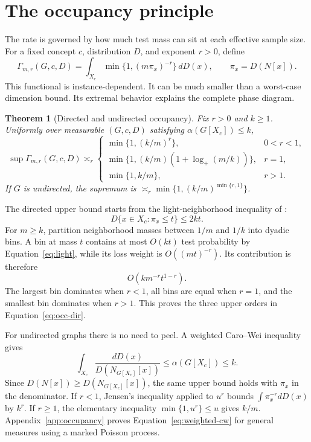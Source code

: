 \documentclass{article}
\newtheorem{theorem}{Theorem}
\theoremstyle{definition}
\theoremstyle{remark}
\newcommand{\gprof}{\Gamma}
\begin{document}
\section{The occupancy principle}
\label{sec:occupancy}

The rate is governed by how much test mass can sit at each effective sample size. For a fixed concept $c$, distribution $D$, and exponent $r>0$, define
\begin{equation}
\gprof_{m,r}(G,c,D)=\int_{X_c}\min\{1,(m\pi_x)^{-r}\}\,dD(x),
\qquad \pi_x=D(N[x]). \label{eq:profile}
\end{equation}
This functional is instance-dependent. It can be much smaller than a worst-case dimension bound. Its extremal behavior explains the complete phase diagram.

\begin{theorem}[Directed and undirected occupancy]
\label{thm:occupancy}
Fix $r>0$ and $k\geq1$. Uniformly over measurable $(G,c,D)$ satisfying $\alpha(G[X_c])\leq k$,
\begin{equation}
\sup \gprof_{m,r}(G,c,D)\asymp_r
\begin{cases}
\min\{1,(k/m)^r\},&0<r<1,\\
\min\{1,(k/m)(1+\log_+(m/k))\},&r=1,\\
\min\{1,k/m\},&r>1.
\end{cases} \label{eq:occ-dir}
\end{equation}
If $G$ is undirected, the supremum is $\asymp_r\min\{1,(k/m)^{\min\{r,1\}}\}$.
\end{theorem}

The directed upper bound starts from the light-neighborhood inequality of \citet{bressan2026conditional}:
\begin{equation}
D\{x\in X_c:\pi_x\leq t\}\leq2kt. \label{eq:light}
\end{equation}
For $m\geq k$, partition neighborhood masses between $1/m$ and $1/k$ into dyadic bins. A bin at mass $t$ contains at most $O(kt)$ test probability by Equation~\eqref{eq:light}, while its loss weight is $O((mt)^{-r})$. Its contribution is therefore
\begin{equation}
O\left(km^{-r}t^{1-r}\right). \label{eq:bin}
\end{equation}
The largest bin dominates when $r<1$, all bins are equal when $r=1$, and the smallest bin dominates when $r>1$. This proves the three upper orders in Equation~\eqref{eq:occ-dir}.

For undirected graphs there is no need to peel. A weighted Caro--Wei inequality \citep{caro1979new,wei1981lower} gives
\begin{equation}
\int_{X_c}\frac{dD(x)}{D(N_{G[X_c]}[x])}\leq\alpha(G[X_c])\leq k. \label{eq:weighted-cw}
\end{equation}
Since $D(N[x])\geq D(N_{G[X_c]}[x])$, the same upper bound holds with $\pi_x$ in the denominator. If $r<1$, Jensen's inequality applied to $u^r$ bounds $\int\pi_x^{-r}dD(x)$ by $k^r$. If $r\geq1$, the elementary inequality $\min\{1,u^r\}\leq u$ gives $k/m$. Appendix~\ref{app:occupancy} proves Equation~\eqref{eq:weighted-cw} for general measures using a marked Poisson process.
\end{document}

